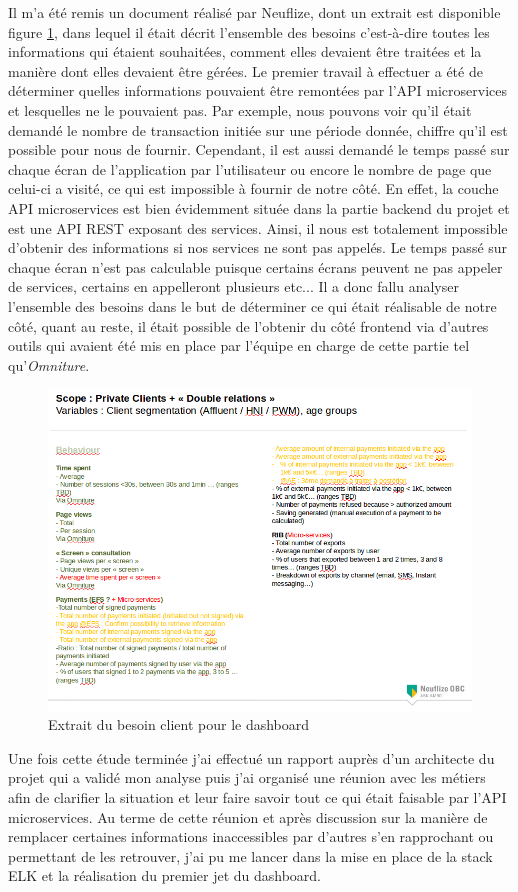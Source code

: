 	Il m'a été remis un document réalisé par Neuflize, dont un extrait est disponible figure \ref{elkBesoin}, dans lequel il était décrit l'ensemble des besoins c'est-à-dire toutes les informations qui étaient souhaitées, comment elles devaient être traitées et la manière dont elles devaient être gérées. Le premier travail à effectuer a été de déterminer quelles informations pouvaient être remontées par l'API microservices et lesquelles ne le pouvaient pas. Par exemple, nous pouvons voir qu'il était demandé le nombre de transaction initiée sur une période donnée, chiffre qu'il est possible pour nous de fournir. Cependant, il est aussi demandé le temps passé sur chaque écran de l'application par l'utilisateur ou encore le nombre de page que celui-ci a visité, ce qui est impossible à fournir de notre côté. En effet, la couche API microservices est bien évidemment située dans la partie backend du projet et est une API REST exposant des services. Ainsi, il nous est totalement impossible d'obtenir des informations si nos services ne sont pas appelés. Le temps passé sur chaque écran n'est pas calculable puisque certains écrans peuvent ne pas appeler de services, certains en appelleront plusieurs etc... Il a donc fallu analyser l'ensemble des besoins dans le but de déterminer ce qui était réalisable de notre côté, quant au reste, il était possible de l'obtenir du côté frontend via d'autres outils qui avaient été mis en place par l'équipe en charge de cette partie tel qu'\textit{Omniture}.
	
\begin{figure}[h!]
	\includegraphics[scale=0.6]{images/travailNeuflizeOBC/dashboard/elkBesoin.png}
	\centering
	\caption{Extrait du besoin client pour le dashboard}
	\label{elkBesoin}
\end{figure}
	
	Une fois cette étude terminée j'ai effectué un rapport auprès d'un architecte du projet qui a validé mon analyse puis j'ai organisé une réunion avec les métiers afin de clarifier la situation et leur faire savoir tout ce qui était faisable par l'API microservices. Au terme de cette réunion et après discussion sur la manière de remplacer certaines informations inaccessibles par d'autres s'en rapprochant ou permettant de les retrouver, j'ai pu me lancer dans la mise en place de la stack ELK \cite{bib_elk} et la réalisation du premier jet du dashboard.